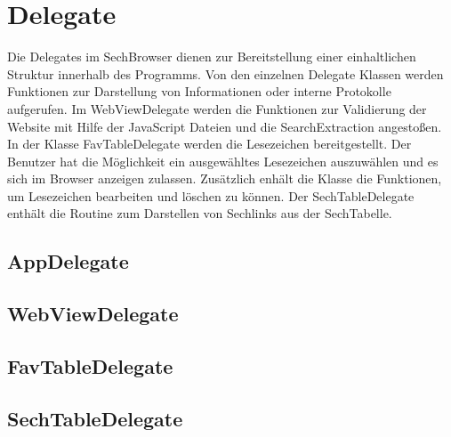 
\section{Delegate}

Die Delegates im SechBrowser dienen zur Bereitstellung einer einhaltlichen Struktur innerhalb des Programms. Von den einzelnen Delegate Klassen werden Funktionen zur Darstellung von Informationen oder interne Protokolle aufgerufen. Im WebViewDelegate werden die Funktionen zur Validierung der Website mit Hilfe der JavaScript Dateien und die SearchExtraction angestoßen. In der Klasse FavTableDelegate werden die Lesezeichen bereitgestellt. Der Benutzer hat die Möglichkeit ein ausgewähltes Lesezeichen auszuwählen und es sich im Browser anzeigen zulassen. Zusätzlich enhält die Klasse die Funktionen, um Lesezeichen bearbeiten und löschen zu können. Der SechTableDelegate enthält die Routine zum Darstellen von Sechlinks aus der SechTabelle. 
\subsection{AppDelegate}
\subsection{WebViewDelegate}
\subsection{FavTableDelegate}
\subsection{SechTableDelegate}

